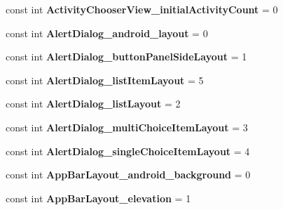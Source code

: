 \begin{DoxyCompactItemize}
\item 
\mbox{\label{classXaria_1_1Resource_1_1Styleable_ad063c4496b70b280794fdcffd61afd00}} 
const int {\bfseries Activity\+Chooser\+View\+\_\+initial\+Activity\+Count} = 0
\item 
\mbox{\label{classXaria_1_1Resource_1_1Styleable_a0eb60675680c76e327f462799998b7ca}} 
const int {\bfseries Alert\+Dialog\+\_\+android\+\_\+layout} = 0
\item 
\mbox{\label{classXaria_1_1Resource_1_1Styleable_a21380e97aa89fcb49cc448a78e2fa37c}} 
const int {\bfseries Alert\+Dialog\+\_\+button\+Panel\+Side\+Layout} = 1
\item 
\mbox{\label{classXaria_1_1Resource_1_1Styleable_a852c89eac72dcba546956579b96f4431}} 
const int {\bfseries Alert\+Dialog\+\_\+list\+Item\+Layout} = 5
\item 
\mbox{\label{classXaria_1_1Resource_1_1Styleable_ae3b2abe997c1306a146fd18b58ea67b9}} 
const int {\bfseries Alert\+Dialog\+\_\+list\+Layout} = 2
\item 
\mbox{\label{classXaria_1_1Resource_1_1Styleable_ac5e148355455346f7e4e51733a1efd59}} 
const int {\bfseries Alert\+Dialog\+\_\+multi\+Choice\+Item\+Layout} = 3
\item 
\mbox{\label{classXaria_1_1Resource_1_1Styleable_a795facbf4106d111f3487362e1864e1b}} 
const int {\bfseries Alert\+Dialog\+\_\+single\+Choice\+Item\+Layout} = 4
\item 
\mbox{\label{classXaria_1_1Resource_1_1Styleable_a40e385cbc8679fe1e1ad548822c0cffd}} 
const int {\bfseries App\+Bar\+Layout\+\_\+android\+\_\+background} = 0
\item 
\mbox{\label{classXaria_1_1Resource_1_1Styleable_a7140b0688881ef7e863f254f810d7fd7}} 
const int {\bfseries App\+Bar\+Layout\+\_\+elevation} = 1
\item 

\end{DoxyCompactItemize}
